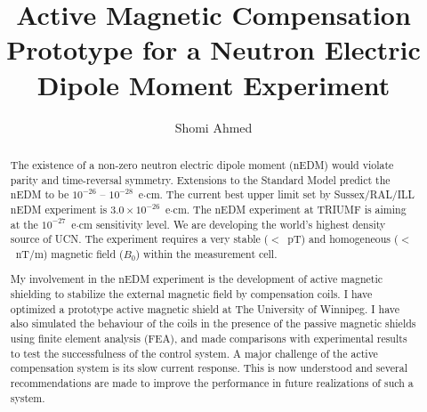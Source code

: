 
\title{Active Magnetic Compensation Prototype for a Neutron Electric Dipole Moment Experiment}
\author{Shomi Ahmed}

%
%
%





\maketitle

\begin{abstract}
The existence of a non-zero neutron electric dipole moment (nEDM) would violate parity and time-reversal symmetry.  Extensions to the Standard Model predict the nEDM to be $10^{-26}$ -- $10^{-28}$~e$\cdot$cm.  The current best upper limit set by Sussex/RAL/ILL nEDM experiment is $3.0 \times 10^{-26}$~e$\cdot$cm\cite{bestLim_1,bestLim_2}.  The nEDM experiment at TRIUMF is aiming at the $10^{-27}$~e$\cdot$cm sensitivity level.  We are developing the world's highest density source of UCN.  The experiment requires a very stable ($<$~pT) and homogeneous ($<$~nT/m) magnetic field ($B_0$) within the measurement cell.  

My involvement in the nEDM experiment is the development of active magnetic shielding to stabilize the external magnetic field by compensation coils. I have optimized a prototype active magnetic shield at The University of Winnipeg. I have also simulated the behaviour of the coils in the presence of the passive magnetic shields  using finite element analysis (FEA), and made comparisons with  experimental results  to test the successfulness of the control system. A major challenge of the active 
compensation system is its  slow current response.  This is now understood and several recommendations are made to improve the performance in future realizations of such a system.





\end{abstract}

